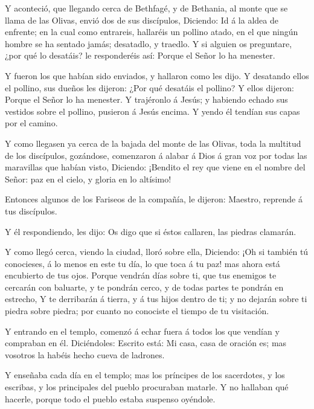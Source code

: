  Y aconteció, que llegando cerca de Bethfagé, y de
Bethania, al monte que se llama de las Olivas, envió dos de sus
discípulos,  Diciendo: Id á la aldea de enfrente; en la
cual como entrareis, hallaréis un pollino atado, en el que ningún hombre
se ha sentado jamás; desatadlo, y traedlo.  Y si alguien os
preguntare, ¿por qué lo desatáis? le responderéis así: Porque el Señor
lo ha menester.

 Y fueron los que habían sido enviados, y hallaron como les
dijo.  Y desatando ellos el pollino, sus dueños les
dijeron: ¿Por qué desatáis el pollino?  Y ellos dijeron:
Porque el Señor lo ha menester.  Y trajéronlo á Jesús; y
habiendo echado sus vestidos sobre el pollino, pusieron á Jesús encima.
 Y yendo él tendían sus capas por el camino.

 Y como llegasen ya cerca de la bajada del monte de las
Olivas, toda la multitud de los discípulos, gozándose, comenzaron á
alabar á Dios á gran voz por todas las maravillas que habían visto,
 Diciendo: ¡Bendito el rey que viene en el nombre del
Señor: paz en el cielo, y gloria en lo altísimo!

 Entonces algunos de los Fariseos de la compañía, le
dijeron: Maestro, reprende á tus discípulos.

 Y él respondiendo, les dijo: Os digo que si éstos
callaren, las piedras clamarán.

 Y como llegó cerca, viendo la ciudad, lloró sobre ella,
 Diciendo: ¡Oh si también tú conocieses, á lo menos en este
tu día, lo que toca á tu paz! mas ahora está encubierto de tus ojos.
 Porque vendrán días sobre ti, que tus enemigos te cercarán
con baluarte, y te pondrán cerco, y de todas partes te pondrán en
estrecho,  Y te derribarán á tierra, y á tus hijos dentro
de ti; y no dejarán sobre ti piedra sobre piedra; por cuanto no
conociste el tiempo de tu visitación.

 Y entrando en el templo, comenzó á echar fuera á todos los
que vendían y compraban en él.  Diciéndoles: Escrito está:
Mi casa, casa de oración es; mas vosotros la habéis hecho cueva de
ladrones.

 Y enseñaba cada día en el templo; mas los príncipes de los
sacerdotes, y los escribas, y los principales del pueblo procuraban
matarle.  Y no hallaban qué hacerle, porque todo el pueblo
estaba suspenso oyéndole.

